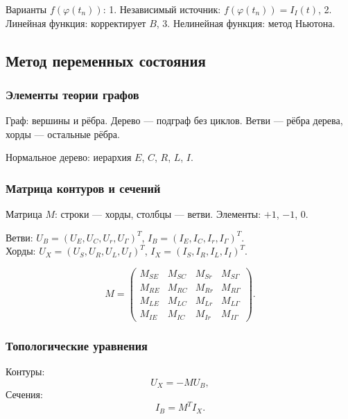 	Варианты $f(\varphi(t_n))$:
	1. Независимый источник: $f(\varphi(t_n)) = I_I(t)$,
	2. Линейная функция: корректирует $B$,
	3. Нелинейная функция: метод Ньютона.
	
	\subsection{Метод переменных состояния}
	
	\subsubsection{Элементы теории графов}
	
	Граф: вершины и рёбра. Дерево — подграф без циклов. Ветви — рёбра дерева, хорды — остальные рёбра.
	
	Нормальное дерево: иерархия $E$, $C$, $R$, $L$, $I$.
	
	\subsubsection{Матрица контуров и сечений}
	
	Матрица $M$: строки — хорды, столбцы — ветви. Элементы: $+1$, $-1$, $0$.
	
	Ветви: $U_B = (U_E, U_C, U_r, U_\Gamma)^T$, $I_B = (I_E, I_C, I_r, I_\Gamma)^T$. \\
	Хорды: $U_X = (U_S, U_R, U_L, U_I)^T$, $I_X = (I_S, I_R, I_L, I_I)^T$.
	
	\begin{equation}
		M = \begin{pmatrix}
			M_{SE} & M_{SC} & M_{Sr} & M_{S\Gamma} \\
			M_{RE} & M_{RC} & M_{Rr} & M_{R\Gamma} \\
			M_{LE} & M_{LC} & M_{Lr} & M_{L\Gamma} \\
			M_{IE} & M_{IC} & M_{Ir} & M_{I\Gamma}
		\end{pmatrix}.
	\end{equation}
	
	\subsubsection{Топологические уравнения}
	
	Контуры:
	\begin{equation}
		U_X = -M U_B,
	\end{equation}
	Сечения:
	\begin{equation}
		I_B = M^T I_X.
	\end{equation}
	
